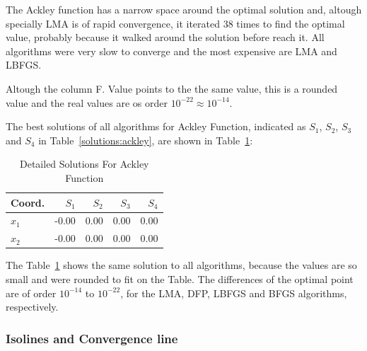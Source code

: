 \documentclass[conference]{IEEEtran}
\begin{document}
The Ackley function has a narrow space around the optimal solution and,
altough specially LMA is of rapid convergence, it iterated 38 times to find
the optimal value, probably because it walked around the solution
before reach it. All algorithms were very slow to converge and the most expensive
are LMA and LBFGS.

Altough the column F. Value points to the the same value, this is a rounded value
and the real values are os order $10^{-22} \approx 10^{-14}$.


The best solutions of all algorithms for Ackley Function, indicated as
$S_{1}$, $S_{2}$, $S_{3}$ and $S_{4}$ in Table~\ref{solutions:ackley}, are shown
in Table~\ref{detailedsolutions:ackley}:

\begin{table}[H]
\centering
\caption{Detailed Solutions For Ackley Function}
\label{detailedsolutions:ackley}
\begin{tabular}{lrrrr}
\toprule
 Coord. &  $S_{1}$ &  $S_{2}$ &  $S_{3}$ &  $S_{4}$ \\
\midrule
$x_{1}$ &    -0.00 &     0.00 &     0.00 &     0.00 \\
$x_{2}$ &    -0.00 &     0.00 &     0.00 &     0.00 \\
\bottomrule
\end{tabular}
\end{table}

The Table~\ref{detailedsolutions:ackley} shows the same solution to all algorithms, because the values are so small
and were rounded to fit on the Table. The differences of the optimal point are of order $10^{-14}$ to $10^{-22}$,
for the LMA, DFP, LBFGS and BFGS algorithms, respectively.


\subsubsection{Isolines and Convergence line}
\label{isolinesackley2D}
\end{document}
